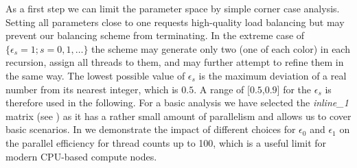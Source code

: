 As a first step we can limit the parameter space by simple corner case
analysis. Setting all parameters close to one requests high-quality load
balancing but may prevent our balancing scheme from terminating. In the extreme
case of $\{\epsilon_s=1; s=0,1,\ldots\}$ the scheme may generate only
two \levelGroups (one of each color) in each recursion, assign all threads to
them, and may further attempt to refine them in the same way.  The lowest
possible value of $\epsilon_s$ is the maximum deviation of a real number from
its nearest integer, which is $0.5$. A range of [$0.5$,$0.9$] for the
$\epsilon_s$ is therefore used in the following. For a basic analysis we have
selected the \emph{inline\_1} matrix (see ) as it has a
rather small amount of parallelism and allows us to cover basic
scenarios. In  we demonstrate the impact of
different choices for $\epsilon_0$ and $\epsilon_1$ on the parallel efficiency
for thread counts up to 100, which is a useful limit for modern CPU-based
compute nodes.
%
